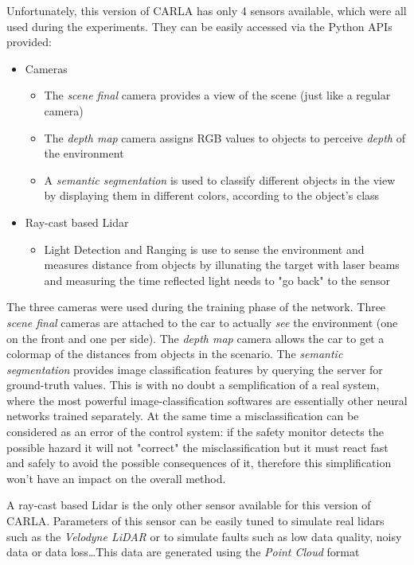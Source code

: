 Unfortunately, this version of CARLA has only 4 sensors available, which were all used during the experiments. They can be easily accessed via the Python APIs provided:

\begin{itemize}
	\item Cameras
	\begin{itemize}
		\item The \textsl{scene final} camera provides a view of the scene (just like a regular camera)
		\item The \textsl{depth map} camera assigns RGB values to objects to perceive \textsl{depth} of the environment
		\item A \textsl{semantic segmentation} is used to classify different objects in the view by displaying them in different colors, according to the object's class
	\end{itemize}
	\item Ray-cast based Lidar
	\begin{itemize}
		\item Light Detection and Ranging is use to sense the environment and measures distance from objects by illunating the target with laser beams and measuring the time reflected light needs to "go back" to the sensor
	\end{itemize}
\end{itemize}

The three cameras were used during the training phase of the network. Three \textsl{scene final} cameras are attached to the car to actually \textsl{see} the environment (one on the front and one per side). The \textsl{depth map} camera allows the car to get a colormap of the distances from objects in the scenario.
The \textsl{semantic segmentation} provides image classification features by querying the server for ground-truth values. This is with no doubt a semplification of a real system, where the most powerful image-classification softwares are essentially other neural networks trained separately. At the same time a misclassification can be considered as an error of the control system: if the safety monitor detects the possible hazard it will not "correct" the misclassification but it must react fast and safely to avoid the possible consequences of it, therefore this simplification won't have an impact on the overall method.\newline

A ray-cast based Lidar is the only other sensor available for this version of CARLA. Parameters of this sensor can be easily tuned to simulate real lidars such as the \textsl{Velodyne LiDAR} or to simulate faults such as low data quality, noisy data or data loss\dots This data are generated using the \textsl{Point Cloud}\cite{pointcloud} format

